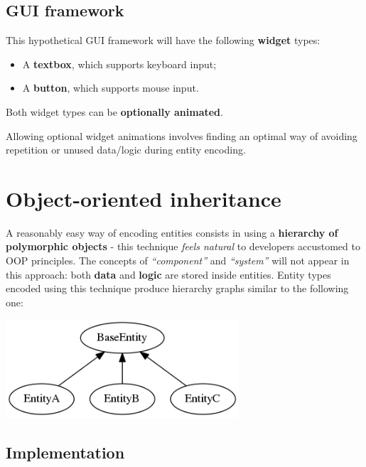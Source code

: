 \documentclass[twoside, 12pt, a4paper, openany]{book}
\let\origfigure=\figure
\let\endorigfigure=\endfigure
\renewenvironment{figure}[1][]{%
\origfigure[H]
}{%
\endorigfigure
}
\begin{document}
\subsection{GUI framework}\label{gui-framework}

This hypothetical GUI framework will have the following \textbf{widget}
types:

\begin{itemize}
\item
  A \textbf{textbox}, which supports keyboard input;
\item
  A \textbf{button}, which supports mouse input.
\end{itemize}

Both widget types can be \textbf{optionally animated}.

Allowing optional widget animations involves finding an optimal way of
avoiding repetition or unused data/logic during entity encoding.

\section{Object-oriented inheritance}\label{object-oriented-inheritance}

A reasonably easy way of encoding entities consists in using a
\textbf{hierarchy of polymorphic objects} - this technique \emph{feels
natural} to developers accustomed to OOP principles. The concepts of
\emph{``component''} and \emph{``system''} will not appear in this
approach: both \textbf{data} and \textbf{logic} are stored inside
entities. Entity types encoded using this technique produce hierarchy
graphs similar to the following one:

\begin{figure}[htbp]
\centering
\includegraphics[width=0.65000\textwidth]{source/figures/generated/ecs/overview/oop/example_hierarchy_0.png}
\caption{Object-oriented inheritance: hypothetical entity hierarchy}
\end{figure}

\subsection{Implementation}\label{implementation}
\end{document}
